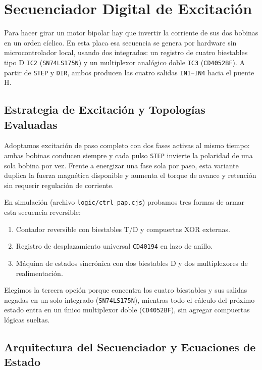 \chapter{Secuenciador Digital de Excitación}
\label{sec:secuenciador_digital}

Para hacer girar un motor bipolar hay que invertir la corriente de sus dos bobinas en un orden cíclico. En esta
placa esa secuencia se genera por hardware sin microcontrolador local, usando dos integrados: un registro de
cuatro biestables tipo D \texttt{IC2} (\texttt{SN74LS175N}) y un multiplexor analógico doble \texttt{IC3}
(\texttt{CD4052BF}). A partir de \texttt{STEP} y \texttt{DIR}, ambos producen las cuatro salidas
\texttt{IN1}--\texttt{IN4} hacia el puente H.

\section{Estrategia de Excitación y Topologías Evaluadas}
\label{sec:estrategia_topologias}

Adoptamos excitación de paso completo con dos fases activas al mismo tiempo: ambas bobinas conducen siempre y cada
pulso \texttt{STEP} invierte la polaridad de una sola bobina por vez. Frente a energizar una fase sola por paso,
esta variante duplica la fuerza magnética disponible y aumenta el torque de avance y retención sin requerir
regulación de corriente.

En simulación (archivo \texttt{logic/ctrl\_pap.cjs}) probamos tres formas de armar esta secuencia reversible:

\begin{enumerate}
  \item Contador reversible con biestables T/D y compuertas XOR externas.
  \item Registro de desplazamiento universal \texttt{CD40194} en lazo de anillo.
  \item Máquina de estados sincrónica con dos biestables D y dos multiplexores de realimentación.
\end{enumerate}

Elegimos la tercera opción porque concentra los cuatro biestables y sus salidas negadas en un solo integrado
(\texttt{SN74LS175N}), mientras todo el cálculo del próximo estado entra en un único multiplexor doble
(\texttt{CD4052BF}), sin agregar compuertas lógicas sueltas.

\section{Arquitectura del Secuenciador y Ecuaciones de Estado}
\label{sec:arquitectura_secuenciador}

